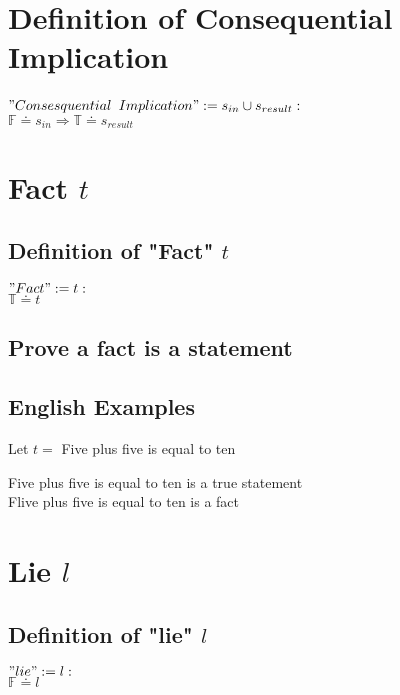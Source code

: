 \documentclass[11pt]{article}
\begin{document}
\section{Definition of Consequential Implication}
\begin{center}
$
"Consesquential$ $Implication" := s_{in} \cup s_{result}:
$
\\ \vspace{2mm}
$
\mathbb{F} \doteq s_{in} \Rightarrow \mathbb{T} \doteq s_{result}
$
\end{center}







\section{Fact $t$}
\subsection{Definition of "Fact" $t$}
\begin{center}
$
"Fact" := t:
$
\\ \vspace{2mm}
$
\mathbb{T} \doteq t
$
\end{center}



\subsection{Prove a fact is a statement}



\subsection{English Examples}
Let $t=$ Five plus five is equal to ten
\begin{center}
Five plus five is equal to ten is a true statement\\ \vspace{2mm}
Flive plus five is equal to ten is a fact
\end{center}




\section{Lie $l$}
\subsection{Definition of "lie" $l$}
\begin{center}
$
"lie" := l:
$
\\ \vspace{2mm}
$
\mathbb{F} \doteq l
$
\end{center}
\end{document}
